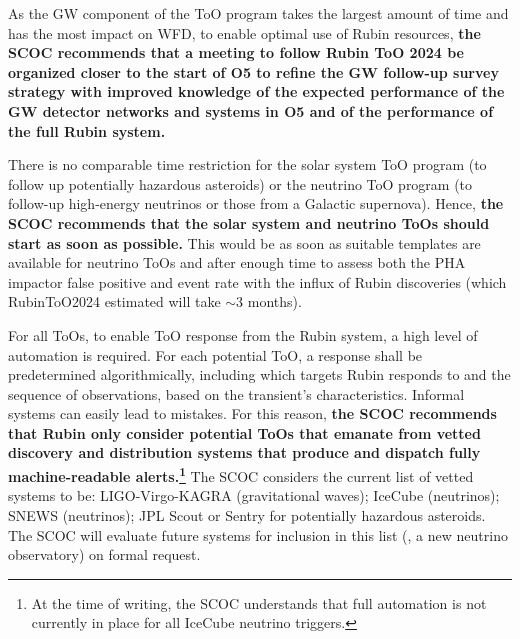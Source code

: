As the GW component of the ToO program takes the largest amount of time and has the most impact on WFD, to enable optimal use of Rubin resources, {\bf the SCOC recommends that a meeting to follow Rubin ToO 2024 be organized closer to the start of O5 to refine the GW follow-up survey strategy with improved knowledge of the expected performance of the GW detector networks and systems in O5 and of the performance of the full Rubin system.}
%

There is no comparable time restriction for the solar system ToO program (to follow up potentially hazardous asteroids) or the neutrino ToO program (to follow-up high-energy neutrinos or those from a Galactic supernova). Hence, 
\textbf{ the SCOC recommends that the solar system and neutrino ToOs should start as soon as possible.} This would be as soon as suitable templates are available for neutrino ToOs and after enough time to assess both the PHA impactor false positive and event rate with the influx of Rubin discoveries (which RubinToO2024 estimated will take \mbox{$\sim$3} months).



For all ToOs, to enable ToO response from the Rubin system, a high level of automation is required. For each potential ToO, a response shall be predetermined algorithmically, including which targets Rubin responds to and the sequence of observations, based on the transient’s characteristics. Informal systems can easily lead to mistakes. For this reason, {\bf the SCOC recommends that Rubin only consider potential ToOs that emanate from vetted discovery and distribution systems that produce and dispatch fully machine-readable alerts.\footnote{At the time of writing, the SCOC understands that full automation is not currently in place for all IceCube neutrino triggers.}} The SCOC considers the current list of vetted systems to be: LIGO-Virgo-KAGRA (gravitational waves); IceCube (neutrinos); SNEWS (neutrinos); JPL Scout or Sentry for potentially hazardous asteroids. The SCOC will evaluate future systems for inclusion in this list (\eg , a new neutrino observatory) on formal request.

